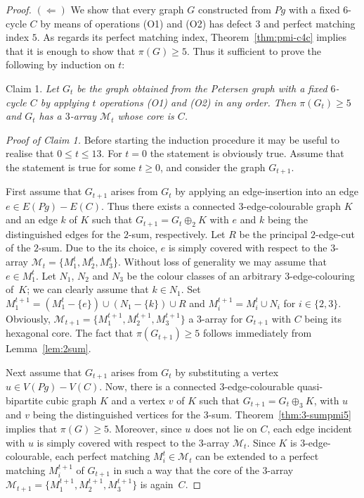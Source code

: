 \documentclass[a4paper]{amsart}
\theoremstyle{plain}
\theoremstyle{definition}
\begin{document}
\begin{proof}
$(\Leftarrow)$ We show that every graph $G$ constructed from
$Pg$ with a fixed $6$-cycle $C$ by means of operations (O1) and
(O2) has defect $3$ and perfect matching index $5$. As regards
its perfect matching index, Theorem~\ref{thm:pmi-c4c} implies
that it is enough to show that $\pi(G)\ge 5$. Thus it
sufficient to prove the following by induction on $t$:

\medskip\noindent
Claim 1. \emph{Let $G_t$ be the graph obtained from the
Petersen graph with a fixed $6$-cycle $C$ by applying $t$
operations {\rm (O1)} and {\rm (O2)} in any order. Then
$\pi(G_t)\ge 5$ and $G_t$ has a $3$-array $\mathcal{M}_t$ whose
core is $C$.}

\medskip\noindent
\emph{Proof of Claim 1.} Before starting the induction
procedure it may be useful to realise that $0\le t\le 13$. For
$t=0$ the statement is obviously true. Assume that the
statement is true for some $t\ge 0$, and consider the graph
$G_{t+1}$.

First assume that $G_{t+1}$ arises from $G_t$ by applying an
edge-insertion into an edge $e\in E(Pg)-E(C)$. Thus there
exists a connected $3$-edge-colourable graph $K$ and an edge
$k$ of $K$ such that $G_{t+1}=G_t\oplus_2 K$ with $e$ and $k$
being the distinguished edges for the $2$-sum, respectively.
Let $R$ be the principal $2$-edge-cut of the $2$-sum. Due to
the its choice, $e$ is simply covered with respect to the
$3$-array $\mathcal{M}_t=\{M_1^t,M_2^t,M_3^t\}$. Without loss
of generality we may assume that $e\in M_1^t$. Let $N_1$, $N_2$
and $N_3$ be the colour classes of an arbitrary
$3$-edge-colouring of~$K$; we can clearly assume that $k\in
N_1$. Set $M_1^{t+1}=(M_1^t-\{e\})\cup (N_1-\{k\})\cup R$ and
$M_i^{t+1}=M_i^t\cup N_i$ for $i\in\{2,3\}$. Obviously,
$\mathcal{M}_{t+1}=\{M_1^{t+1},M_2^{t+1},M_3^{t+1}\}$ a
$3$-array for $G_{t+1}$ with $C$ being its hexagonal core. The
fact that $\pi(G_{t+1})\ge 5$ follows immediately from
Lemma~\ref{lem:2sum}.

Next assume that $G_{t+1}$ arises from $G_t$ by substituting a
vertex $u\in V(Pg)-V(C)$. Now, there is a connected
$3$-edge-colourable quasi-bipartite cubic graph $K$ and a
vertex $v$ of $K$ such that $G_{t+1}=G_t\oplus_3 K$, with $u$
and $v$ being the distinguished vertices for the $3$-sum.
Theorem~\ref{thm:3-sumpmi5} implies that $\pi(G)\ge 5$.
Moreover, since $u$ does not lie on $C$, each edge incident
with $u$ is simply covered with respect to the $3$-array
$\mathcal{M}_t$. Since $K$ is $3$-edge-colourable, each perfect
matching $M_i^t\in\mathcal{M}_t$ can be extended to a perfect
matching $M_i^{t+1}$ of $G_{t+1}$ in such a way that the core
of the $3$-array
$\mathcal{M}_{t+1}=\{M_1^{t+1},M_2^{t+1},M_3^{t+1}\}$ is
again~$C$.


\end{proof}
\end{document}
